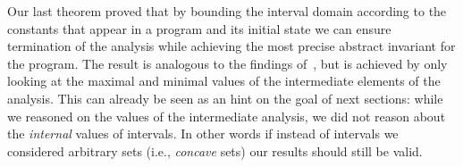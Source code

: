 

Our last theorem proved that by bounding the interval domain according
to the constants that appear in a program and its initial state we can
ensure termination of the analysis while achieving the most precise
abstract invariant for the program. The result is analogous to the
findings of~\cite{Gawlitza2009}, but is achieved by only looking at the
maximal and minimal values of the intermediate elements of the
analysis. This can already be seen as an hint on the goal of next
sections: while we reasoned on the values of the intermediate
analysis, we did not reason about the \emph{internal} values of
intervals. In other words if instead of intervals we considered
arbitrary sets (i.e., \emph{concave} sets) our results should still be
valid.

